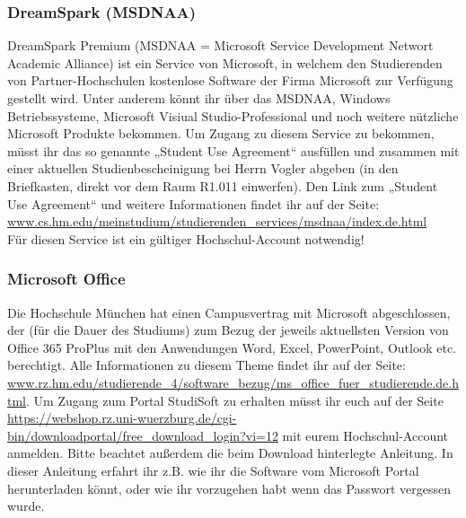 \subsubsection{DreamSpark (MSDNAA)}
DreamSpark Premium (MSDNAA = Microsoft Service Development 
Networt Academic Alliance) ist ein Service von Microsoft, in welchem 
den Studierenden von Partner-Hochschulen kostenlose Software der 
Firma Microsoft zur Verfügung gestellt wird. \doublebreak
Unter anderem könnt ihr über das MSDNAA, Windows Betriebssysteme, 
Microsoft Visiual Studio-Professional und noch weitere nützliche Microsoft Produkte bekommen. \doublebreak
Um Zugang zu diesem Service zu bekommen, müsst ihr das so genannte 
„Student Use Agreement“ ausfüllen und zusammen mit einer aktuellen 
Studienbescheinigung bei Herrn Vogler abgeben (in den Briefkasten, 
direkt vor dem Raum R1.011 einwerfen). \doublebreak
Den Link zum „Student Use Agreement“ und weitere Informationen 
findet ihr auf der Seite: \url{www.cs.hm.edu/meinstudium/studierenden_services/msdnaa/index.de.html}\\
Für diesen Service ist ein gültiger Hochschul-Account notwendig!

\subsubsection{Microsoft Office}
Die Hochschule München hat einen Campusvertrag mit Microsoft abgeschlossen, der (für die Dauer des Studiums) zum Bezug der jeweils aktuellsten Version von Office 365 ProPlus mit den Anwendungen Word, Excel, PowerPoint, Outlook etc. berechtigt. Alle Informationen zu diesem Theme findet ihr auf der Seite: \url{www.rz.hm.edu/studierende_4/software_bezug/ms_office_fuer_studierende.de.html}.\doublebreak
Um Zugang zum Portal StudiSoft zu erhalten müsst ihr euch auf der Seite\\
\url{https://webshop.rz.uni-wuerzburg.de/cgi-bin/downloadportal/free_download_login?vi=12} mit eurem Hochschul-Account anmelden. Bitte beachtet außerdem die beim Download hinterlegte Anleitung. In dieser Anleitung erfahrt ihr z.B. wie ihr die Software vom Microsoft Portal herunterladen könnt, oder wie ihr vorzugehen habt wenn das Passwort vergessen wurde.